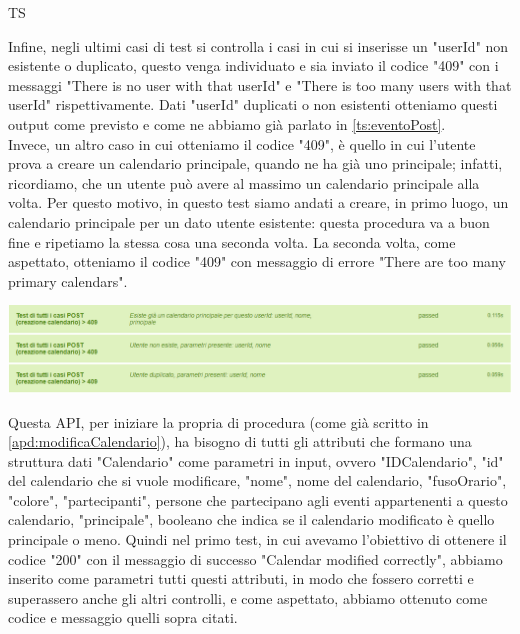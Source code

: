 \begin{listaPersonale}{TS}
\begin{center}
                \end{center}
                Infine, negli ultimi casi di test si controlla i casi in cui si inserisse un "userId" non esistente o duplicato, questo venga individuato e sia inviato il codice "409" con i messaggi "There is no user with that userId" e "There is too many users with that userId" rispettivamente. Dati "userId" duplicati o non esistenti otteniamo questi output come previsto e come ne abbiamo già parlato in \ref{ts:eventoPost}. \\
                Invece, un altro caso in cui otteniamo il codice "409", è quello in cui l'utente prova a creare un calendario principale, quando ne ha già uno principale; infatti, ricordiamo, che un utente può avere al massimo un calendario principale alla volta. Per questo motivo, in questo test siamo andati a creare, in primo luogo, un calendario principale per un dato utente esistente: questa procedura va a buon fine e ripetiamo la stessa cosa una seconda volta. La seconda volta, come aspettato, otteniamo il codice "409" con messaggio di errore "There are too many primary calendars".
                \begin{center}
                        \includegraphics[width=1\textwidth, height=0.12\textheight]{img/png/tests/CalendarioPost/409_postCalendario.png}
                \end{center}
                Questa API, per iniziare la propria di procedura (come già scritto in \ref{apd:modificaCalendario}), ha bisogno di tutti gli attributi che formano una struttura dati "Calendario" come parametri in input, ovvero "IDCalendario", "id" del calendario che si vuole modificare, "nome", nome del calendario, "fusoOrario", "colore", "partecipanti", persone che partecipano agli eventi appartenenti a questo calendario, "principale", booleano che indica se il calendario modificato è quello principale o meno. Quindi nel primo test, in cui avevamo l'obiettivo di ottenere il codice "200" con il messaggio di successo "Calendar modified correctly", abbiamo inserito come parametri tutti questi attributi, in modo che fossero corretti e superassero anche gli altri controlli, e come aspettato, abbiamo ottenuto come codice e messaggio quelli sopra citati.

\end{listaPersonale}
